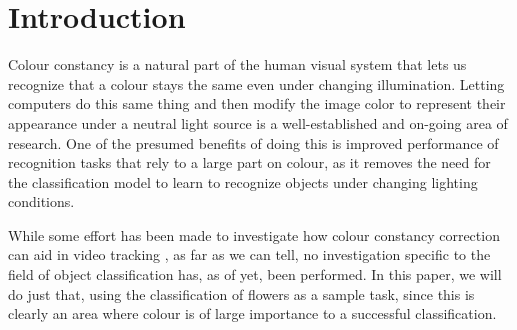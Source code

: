 \section{Introduction}

Colour constancy is a natural part of the human visual system that lets us recognize that a colour
stays the same even under changing illumination. Letting computers do this same thing and then 
modify the image color to represent their appearance under a neutral light source is a well-established
and on-going area of research. One of the presumed benefits of doing this is improved performance 
of recognition tasks that rely to a large part on colour, as it removes the need for the classification
model to learn to recognize objects under changing lighting conditions.

While some effort has been made to investigate how colour constancy correction can aid in video tracking
\cite{Agarwal2006}, as far as we can tell, no investigation specific to the field of object
classification has, as of yet, been performed. In this paper, we will do just that, using the
classification of flowers as a sample task, since this is clearly an area where colour is of large
importance to a successful classification.


